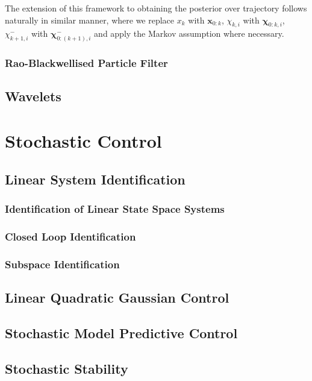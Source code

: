 \documentclass[11pt]{report} %
\begin{document}
The extension of this framework to obtaining the posterior over trajectory follows naturally in similar manner, where we replace $x_{k}$ with $\mathbf{x}_{0:k}$, $\chi_{k, i}$ with $\boldsymbol{\chi}_{0:k, i}$, $\chi_{k + 1, i}^{-}$ with $\boldsymbol{\chi}_{0:\left(k + 1\right), i}^{-}$ and apply the Markov assumption where necessary.

\subsection{Rao-Blackwellised Particle Filter}

\section{Wavelets}

\chapter{Stochastic Control}

\section{Linear System Identification}

\subsection{Identification of Linear State Space Systems}

\subsection{Closed Loop Identification \cite{Kumar1986}}

\subsection{Subspace Identification}

\section{Linear Quadratic Gaussian Control}

\section{Stochastic Model Predictive Control}

\section{Stochastic Stability}
\end{document}
